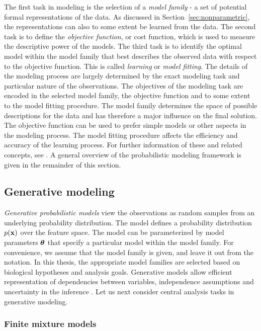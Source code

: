 The first task in modeling is the selection of a \emph{model family} -
a set of potential formal representations of the data. As discussed in
Section~\ref{sec:nonparametric}, the representations can also to some
extent be learned from the data. The second task is to define the
\emph{objective function}, or cost function, which is used to measure
the descriptive power of the models. The third task is to identify the
optimal model within the model family that best describes the observed
data with respect to the objective function. This is called {\it
  learning} or {\it model fitting}. The details of the modeling
process are largely determined by the exact modeling task and
particular nature of the observations.  The objectives of the modeling
task are encoded in the selected model family, the objective function
and to some extent to the model fitting procedure. The model family
determines the space of possible descriptions for the data and has
therefore a major influence on the final solution. The objective
function can be used to prefer simple models or other aspects in the
modeling process. The model fitting procedure affects the efficiency
and accuracy of the learning process.  For further information of
these and related concepts, see \cite{Bishop06}. A general overview of
the probabilistic modeling framework is given in the remainder of this
section.

\subsection{Generative modeling}\label{sec:generative}

\emph{Generative probabilistic models} view the observations as random
samples from an underlying probability distribution. The model defines
a probability distribution \(p(\mathbf{x})\) over the feature space.  The
model can be parameterized by model parameters $\boldsymbol{\theta}$ that specify a
particular model within the model family.  For convenience, we assume
that the model family is given, and leave it out from the notation. In
this thesis, the appropriate model families are selected based on
biological hypotheses and analysis goals. Generative models allow
efficient representation of dependencies between variables,
independence assumptions and uncertainty in the inference
\citep{Koller09}. Let us next consider central analysis tasks in
generative modeling.


\subsubsection{Finite mixture models}\label{sec:finitemixtures}

